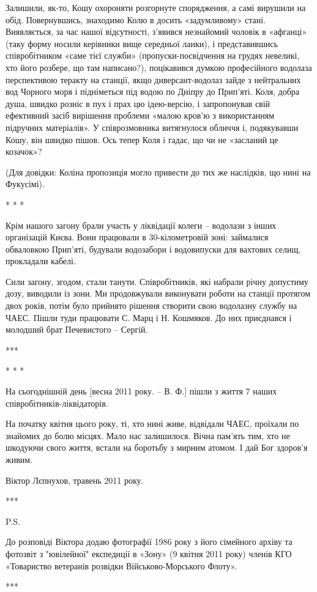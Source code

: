 Залишили, як-то, Кошу охороняти розгорнуте спорядження, а самі вирушили на
обід. Повернувшись, знаходимо Колю в досить «задумливому» стані. Виявляється,
за час нашої відсутності, з'явився незнайомий чоловік в «афганці» (таку форму
носили керівники вище середньої ланки), і представившись співробітником «саме
тієї служби» (пропуски-посвідчення на грудях невеликі, хто його розбере, що там
написано?), поцікавився думкою професійного водолаза перспективою теракту на
станції, якщо диверсант-водолаз зайде з нейтральних вод Чорного моря і
підніметься під водою по Дніпру до Прип'яті. Коля, добра душа, швидко розніс в
пух і прах цю ідею-версію, і запропонував свій ефективний засіб вирішення
проблеми «малою кров'ю з використанням підручних матеріалів». У співрозмовника
витягнулося обличчя і, подякувавши Кошу, він швидко пішов. Ось тепер Коля і
гадає, що чи не «засланий це козачок»? 

(Для довідки: Коліна пропозиція могло привести до тих же наслідків, що нині на
Фукусімі).

* * *

Крім нашого загону брали участь у ліквідації колеги – водолази з інших
організацій Києва. Вони працювали в 30-кілометровій зоні: займалися обваловкою
Прип'яті, будували водозабори і водовипуски для вахтових селищ, прокладали
кабелі.

Сили загону, згодом, стали танути. Співробітників, які набрали річну допустиму
дозу, виводили із зони. Ми продовжували виконувати роботи на станції протягом
двох років, потім було прийнято рішення створити свою водолазну службу на ЧАЕС.
Пішли туди працювати С. Марц і Н. Кошмяков. До них приєднався і молодший брат
Печевистого – Сергій.

***

* * *

На сьогоднішній день [весна 2011 року. – В. Ф.] пішли з життя 7 наших
співробітників-ліквідаторів. 

На початку квітня цього року, ті, хто нині живе, відвідали ЧАЕС, проїхали по
знайомих до болю місцях. Мало нас залишилося. Вічна пам'ять тим, хто не
шкодуючи свого життя, встали на боротьбу з мирним атомом. І дай Бог здоров'я
живим.

Віктор Лєпнухов, травень 2011 року.

***

P.S.

До розповіді Віктора додаю фотографії 1986 року з його сімейного архіву та
фотозвіт з "ювілейної" експедиції в «Зону» (9 квітня 2011 року) членів КГО
«Товариство ветеранів розвідки Військово-Морського Флоту».

***
